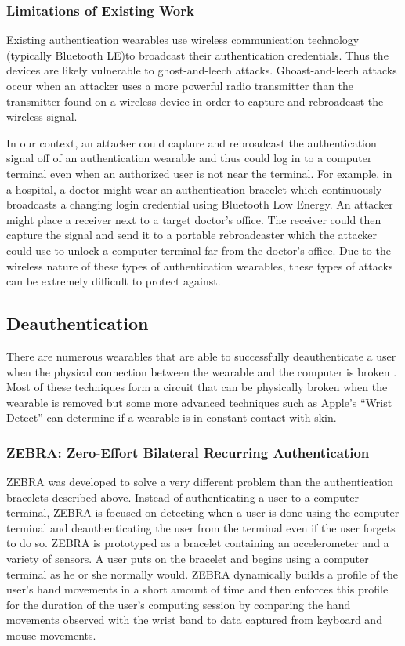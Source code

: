 \subsubsection{Limitations of Existing Work}
Existing authentication wearables use wireless communication technology (typically Bluetooth LE)to broadcast their authentication credentials.  Thus the devices are likely vulnerable to ghost-and-leech attacks.  Ghoast-and-leech attacks occur when an attacker uses a more powerful radio transmitter than the transmitter found on a wireless device in order to capture and rebroadcast the wireless signal.  

\par
In our context, an attacker could capture and rebroadcast the authentication signal off of an authentication wearable and thus could log in to a computer terminal even when an authorized user is not near the terminal.  For example, in a hospital, a doctor might wear an authentication bracelet which continuously broadcasts a changing login credential using Bluetooth Low Energy.  An attacker might place a receiver next to a target doctor’s office.  The receiver could then capture the signal and send it to a portable rebroadcaster which the attacker could use to unlock a computer terminal far from the doctor’s office.  Due to the wireless nature of these types of authentication wearables, these types of attacks can be extremely difficult to protect against.

\subsection{Deauthentication}
There are numerous wearables that are able to successfully deauthenticate a user when the physical connection between the wearable and the computer is broken \cite{}.  Most of these techniques form a circuit that can be physically broken when the wearable is removed \cite{} but some more advanced techniques such as Apple’s “Wrist Detect” \cite{} can determine if a wearable is in constant contact with skin.

\subsubsection{ZEBRA: Zero-Effort Bilateral Recurring Authentication}
ZEBRA \cite{} was developed to solve a very different problem than the authentication bracelets described above.  Instead of authenticating a user to a computer terminal, ZEBRA is focused on detecting when a user is done using the computer terminal and deauthenticating the user from the terminal even if the user forgets to do so.  ZEBRA is prototyped as a bracelet containing an accelerometer and a variety of sensors.  A user puts on the bracelet and begins using a computer terminal as he or she normally would.  ZEBRA dynamically builds a profile of the user’s hand movements in a short amount of time and then enforces this profile for the duration of the user’s computing session by comparing the hand movements observed with the wrist band to data captured from keyboard and mouse movements.